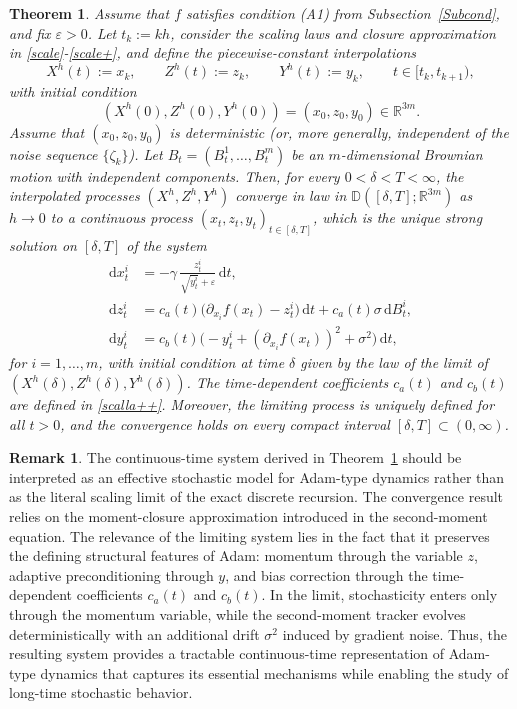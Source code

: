 \documentclass[11pt, a4paper,leqno]{amsart}
\newtheorem{theorem}{Theorem}[section]
\theoremstyle{definition}
\newtheorem{remark}{Remark}[section]
\numberwithin{equation}{section}
\begin{document}
\begin{theorem}\label{Thm1}
Assume that $f$ satisfies condition \textnormal{(A1)} from Subsection~\ref{Subcond}, and fix $\varepsilon>0$. Let $t_k:=kh$, consider the scaling laws and closure approximation in \eqref{scale}-\eqref{scale+}, and define the piecewise-constant interpolations
\[
X^h(t):=x_k,\qquad Z^h(t):=z_k,\qquad Y^h(t):=y_k,
\qquad t\in[t_k,t_{k+1}),
\]
with initial condition
\[
(X^h(0),Z^h(0),Y^h(0))=(x_0,z_0,y_0)\in\mathbb R^{3m}.
\]
Assume that $(x_0,z_0,y_0)$ is deterministic (or, more generally, independent of the noise sequence $\{\zeta_k\}$). Let $B_t=(B_t^1,\dots,B_t^m)$ be an $m$-dimensional Brownian motion with independent components. Then, for every $0<\delta<T<\infty$, the interpolated processes $(X^h,Z^h,Y^h)$ converge in law in $\mathbb{D}([\delta,T];\mathbb{R}^{3m})$ as $h\to0$ to a continuous process $(x_t,z_t,y_t)_{t\in[\delta,T]}$, which is the unique strong solution on $[\delta,T]$ of the system
\begin{align}
\mathrm{d}x_t^i &= -\gamma\,\frac{z_t^i}{\sqrt{y_t^i}+\varepsilon}\,\mathrm{d}t, \label{eq:cts-x}\\
\mathrm{d}z_t^i &= c_a(t)\bigl(\partial_{x_i}f(x_t)-z_t^i\bigr)\,\mathrm{d}t
                 + c_a(t)\sigma\,\mathrm{d}B_t^i, \label{eq:cts-z}\\
\mathrm{d}y_t^i &= c_b(t)\bigl(-y_t^i + (\partial_{x_i}f(x_t))^2 + \sigma^2\bigr)\,\mathrm{d}t, \label{eq:cts-y}
\end{align}
for $i=1,\dots,m$, with initial condition at time $\delta$ given by the law of the limit of $(X^h(\delta),Z^h(\delta),Y^h(\delta))$.  The time-dependent coefficients $c_a(t)$ and $c_b(t)$ are defined in \eqref{scalla++}. Moreover, the limiting process is uniquely defined for all $t>0$, and the convergence holds on every compact interval $[\delta,T]\subset(0,\infty)$.
\end{theorem}




\begin{remark}
The continuous-time system derived in Theorem~\ref{Thm1} should be interpreted as an effective stochastic model for Adam-type dynamics rather than as the literal scaling limit of the exact discrete recursion. The convergence result relies on the moment-closure approximation introduced in the second-moment equation. The relevance of the limiting system lies in the fact that it preserves the defining structural features of Adam: momentum through the variable $z$, adaptive preconditioning through $y$, and bias correction through the time-dependent coefficients $c_a(t)$ and $c_b(t)$. In the limit, stochasticity enters only through the momentum variable, while the second-moment tracker evolves deterministically with an additional drift $\sigma^2$ induced by gradient noise. Thus, the resulting system provides a tractable continuous-time representation of Adam-type dynamics that captures its essential mechanisms while enabling the study of long-time stochastic behavior.
\end{remark}
\end{document}
